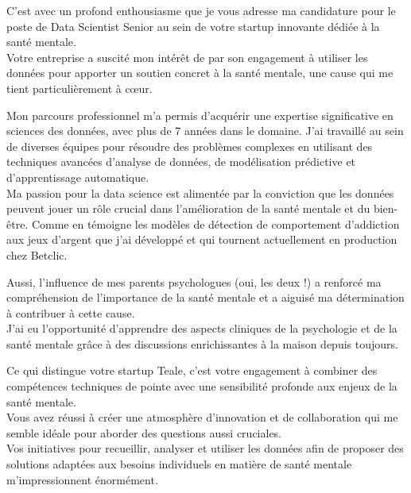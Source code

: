 \documentclass[11pt, a4paper]{awesome-cv}
\begin{document}
\makecvheader[R]


\makelettertitle

\begin{cvletter}



C'est avec un profond enthousiasme que je vous adresse ma candidature pour le poste de Data Scientist Senior au sein de votre startup innovante dédiée à la santé mentale.\\
Votre entreprise a suscité mon intérêt de par son engagement à utiliser les données pour apporter un soutien concret à la santé mentale, une cause qui me tient particulièrement à cœur.

Mon parcours professionnel m'a permis d'acquérir une expertise significative en sciences des données, avec plus de 7 années dans le domaine.
J'ai travaillé au sein de diverses équipes pour résoudre des problèmes complexes en utilisant des techniques avancées d'analyse de données, de modélisation prédictive et d'apprentissage automatique.\\
Ma passion pour la data science est alimentée par la conviction que les données peuvent jouer un rôle crucial dans l'amélioration de la santé mentale et du bien-être. Comme en témoigne les modèles de détection de comportement d'addiction aux jeux d'argent que j'ai développé et qui tournent actuellement en production chez Betclic.

Aussi, l'influence de mes parents psychologues (oui, les deux !) a renforcé ma compréhension de l'importance de la santé mentale et a aiguisé ma détermination à contribuer à cette cause. \\
J'ai eu l'opportunité d'apprendre des aspects cliniques de la psychologie et de la santé mentale grâce à des discussions enrichissantes à la maison depuis toujours.

Ce qui distingue votre startup Teale, c'est votre engagement à combiner des compétences techniques de pointe avec une sensibilité profonde aux enjeux de la santé mentale. \\
Vous avez réussi à créer une atmosphère d'innovation et de collaboration qui me semble idéale pour aborder des questions aussi cruciales. \\
Vos initiatives pour recueillir, analyser et utiliser les données afin de proposer des solutions adaptées aux besoins individuels en matière de santé mentale m'impressionnent énormément.


\end{cvletter}
\end{document}
